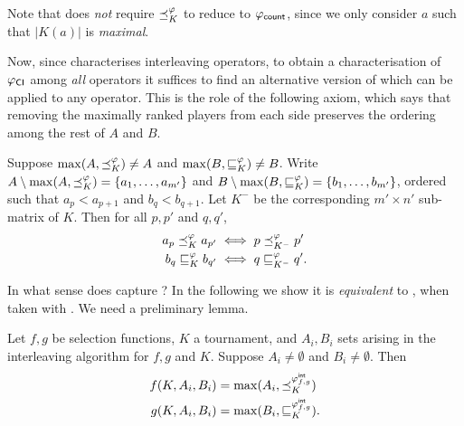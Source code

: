 Note that \argmaxaxiom{} does \emph{not} require $\preceq_K^\varphi$ to reduce to
${\varphi_{\mathsf{count}}}$, since we only consider $a$ such that $|K(a)|$ is \emph{maximal}.

Now, since \chaindef{} characterises interleaving operators, to obtain
a characterisation of ${\varphi_{\mathsf{CI}}}$ among \emph{all} operators it suffices to
find an alternative version of \smi{} which can be applied to any
operator. This is the role of the following axiom, which says that removing the
maximally ranked players from each side preserves the ordering among the rest
of $A$ and $B$.

\begin{axiom}[\rankremoval{}]
    Suppose $\max(A, {\preceq_K^\varphi}) \ne A$ and $\max(B, {\sqsubseteq_K^\varphi}) \ne B$.
    Write $A \setminus \max(A, {\preceq_K^\varphi}) = \{a_1, \ldots, a_{m'}\}$ and $B
    \setminus \max(B, {\sqsubseteq_K^\varphi}) = \{b_1, \ldots, b_{m'}\}$, ordered such
    that $a_p < a_{p+1}$ and $b_q < b_{q+1}$. Let $K^-$ be the corresponding
    $m' \times n'$ sub-matrix of $K$. Then for all $p, p'$ and $q, q'$,
    \begin{align*}
        a_p \preceq_K^\varphi a_{p'} &\iff p \preceq_{K^-}^\varphi p' \\
        b_q \sqsubseteq_K^\varphi b_{q'} &\iff q \sqsubseteq_{K^-}^\varphi q'.
    \end{align*}
\end{axiom}

In what sense does \rankremoval{} capture \smi{}? In the
following we show it is \emph{equivalent} to \smi{}, when taken with
\chaindef{}. We need a preliminary lemma.

\begin{lemma}
    \label{tourn_result_selectionfunction_lemma}
    Let $f, g$ be selection functions, $K$ a tournament, and $A_i, B_i$ sets
    arising in the interleaving algorithm for $f, g$ and $K$. Suppose $A_i \ne
    \emptyset$ and $B_i \ne \emptyset$. Then
    \begin{align*}
        f(K, A_i, B_i) &= \max(A_i, {\preceq_K^{{\varphi_{f, g}^\mathsf{int}}}}) \\
        g(K, A_i, B_i) &= \max(B_i, {\sqsubseteq_K^{{\varphi_{f, g}^\mathsf{int}}}}).
    \end{align*}
\end{lemma}

